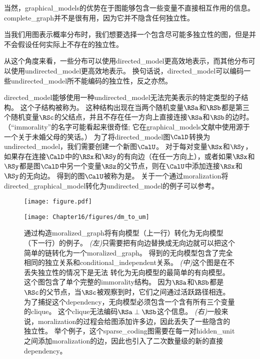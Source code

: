 当然，\gls{graphical_models}的优势在于图能够包含一些变量不直接相互作用的信息。 
\gls{complete_graph}并不是很有用，因为它并不隐含任何独立性。


当我们用图表示概率分布时，我们想要选择一个包含尽可能多独立性的图，但是并不会假设任何实际上不存在的独立性。


从这个角度来看，一些分布可以使用\gls{directed_model}更高效地表示，而其他分布可以使用\gls{undirected_model}更高效地表示。
换句话说，\gls{directed_model}可以编码一些\gls{undirected_model}所不能编码的独立性，反之亦然。


\gls{directed_model}能够使用一种\gls{undirected_model}无法完美表示的特定类型的子结构。
这个子结构被称为。
这种结构出现在当两个随机变量$\RSa$和$\RSb$都是第三个随机变量$\RSc$的父结点，并且不存在任一方向上直接连接$\RSa$和$\RSb$的边时。
（``\gls{immorality}''的名字可能看起来很奇怪; 它在\gls{graphical_models}文献中使用源于一个关于未婚父母的笑话。）
为了将\gls{directed_model}图$\CalD$转换为\gls{undirected_model}，我们需要创建一个新图$\CalU$。
对于每对变量$\RSx$和$\RSy$，如果存在连接$\CalD$中的$\RSx$和$\RSy$的有向边（在任一方向上），或者如果$\RSx$和$\RSy$都是图$\CalD$中另一个变量$\RSz$的父节点，则在$\CalU$中添加连接$\RSx$和$\RSy$的无向边。 
得到的图$\CalU$被称为是。
关于一个通过\gls{moralization}将\gls{directed_graphical_model}转化为\gls{undirected_model}的例子可以参考。


\begin{figure}[!htb]
\ifOpenSource
\centerline{\texttt{[image: figure.pdf]}}
\else
	\centerline{\texttt{[image: Chapter16/figures/dm\_to\_um]}}	
\fi
\caption{通过构造\gls{moralized_graph}将有向模型（上一行）转化为无向模型（下一行）的例子。
\emph{(左)}只需要把有向边替换成无向边就可以把这个简单的链转化为一个\gls{moralized_graph}。
得到的无向模型包含了完全相同的独立关系和\gls{conditional_independent}关系。
\emph{(中)}这个图是在不丢失独立性的情况下是无法
转化为无向模型的最简单的有向模型。
这个图包含了单个完整的\gls{immorality}结构。
因为$\RSa$和$\RSb$都是$\RSc$的父节点，当$\RSc$被观察到时，它们之间通过活跃路径相连。
为了捕捉这个\gls{dependency}，无向模型必须包含一个含有所有三个变量的\gls{clique}。
这个\gls{clique}无法编码$\RSa \perp \RSb$这个信息。
\emph{(右)}一般来说，\gls{moralization}的过程会给图添加许多边，因此丢失了一些隐含的独立性。
举个例子，这个\gls{sparse_coding}图需要在每一对\gls{hidden_unit}之间添加\gls{moralization}的边，因此也引入了二次数量级的新的直接\gls{dependency}。}
	\label{fig:dm_to_um}
\end{figure}



